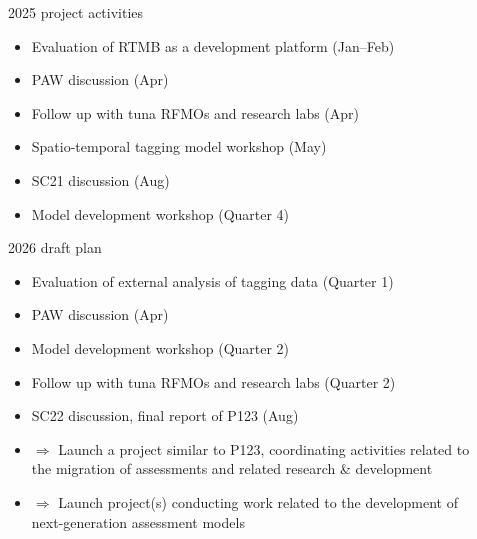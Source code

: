 \documentclass[aspectratio=169,fleqn]{beamer}
\begin{document}

\begin{frame}{2025 project activities}
  \begin{itemize}
    \item[] Evaluation of RTMB as a development platform (Jan--Feb)\\[3ex]
    \item[] PAW discussion (Apr)\\[3ex]
    \item[] Follow up with tuna RFMOs and research labs (Apr)\\[3ex]
    \item[] Spatio-temporal tagging model workshop (May)\\[3ex]
    \item[] SC21 discussion (Aug)\\[3ex]
    \item[] Model development workshop (Quarter 4)\\[2ex]
  \end{itemize}
\end{frame}


\begin{frame}{2026 draft plan}
  \begin{itemize}
    \item[] Evaluation of external analysis of tagging data (Quarter 1)\\[2ex]
    \item[] PAW discussion (Apr)\\[2ex]
    \item[] Model development workshop (Quarter 2)\\[2ex]
    \item[] Follow up with tuna RFMOs and research labs (Quarter 2)\\[2ex]
    \item[] SC22 discussion, final report of P123 (Aug)\\[2ex]
    \item[] $\Rightarrow$ Launch a project similar to P123, {\green
      coordinating} activities related to\\
    \phantom{$\Rightarrow$} the migration of assessments and related research \&
    development\\[2ex]
    \item[] $\Rightarrow$ Launch project(s) {\green conducting} work related to
    the development of\\
    \phantom{$\Rightarrow$} next-generation assessment models\\[2ex]
  \end{itemize}
\end{frame}
\end{document}
